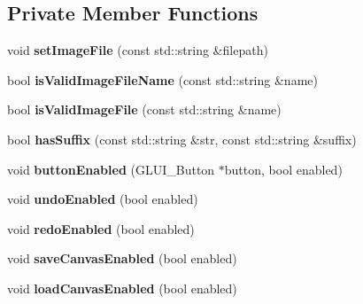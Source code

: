 \subsection*{Private Member Functions}
\begin{DoxyCompactItemize}
\item 
\hypertarget{classFlashPhotoApp_a262d3fad41e5feb441b4ea431c65f8c1}{void {\bfseries set\-Image\-File} (const std\-::string \&filepath)}\label{classFlashPhotoApp_a262d3fad41e5feb441b4ea431c65f8c1}

\item 
\hypertarget{classFlashPhotoApp_a05fb136c74949eb11f07f161e18b0e44}{bool {\bfseries is\-Valid\-Image\-File\-Name} (const std\-::string \&name)}\label{classFlashPhotoApp_a05fb136c74949eb11f07f161e18b0e44}

\item 
\hypertarget{classFlashPhotoApp_af9f413e89445c3a0210e69d542affd67}{bool {\bfseries is\-Valid\-Image\-File} (const std\-::string \&name)}\label{classFlashPhotoApp_af9f413e89445c3a0210e69d542affd67}

\item 
\hypertarget{classFlashPhotoApp_a346a7760598d8dd3c6ddb0630b1e51b6}{bool {\bfseries has\-Suffix} (const std\-::string \&str, const std\-::string \&suffix)}\label{classFlashPhotoApp_a346a7760598d8dd3c6ddb0630b1e51b6}

\item 
\hypertarget{classFlashPhotoApp_a886a76eaa5e30c1708a96cc62cd98887}{void {\bfseries button\-Enabled} (G\-L\-U\-I\-\_\-\-Button $\ast$button, bool enabled)}\label{classFlashPhotoApp_a886a76eaa5e30c1708a96cc62cd98887}

\item 
\hypertarget{classFlashPhotoApp_aa4ceaa973c4cd8b953e4e09d0a5a81ff}{void {\bfseries undo\-Enabled} (bool enabled)}\label{classFlashPhotoApp_aa4ceaa973c4cd8b953e4e09d0a5a81ff}

\item 
\hypertarget{classFlashPhotoApp_a03e224580f502076a6c498a35fb8069f}{void {\bfseries redo\-Enabled} (bool enabled)}\label{classFlashPhotoApp_a03e224580f502076a6c498a35fb8069f}

\item 
\hypertarget{classFlashPhotoApp_af370462c4a82dd932ae7364fc58e3959}{void {\bfseries save\-Canvas\-Enabled} (bool enabled)}\label{classFlashPhotoApp_af370462c4a82dd932ae7364fc58e3959}

\item 
\hypertarget{classFlashPhotoApp_aa04f2738fdb07a7eaa86f146c7537a70}{void {\bfseries load\-Canvas\-Enabled} (bool enabled)}\label{classFlashPhotoApp_aa04f2738fdb07a7eaa86f146c7537a70}


\end{DoxyCompactItemize}
